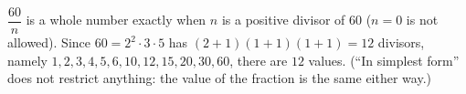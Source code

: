 $\dfrac{60}n$ is a whole number exactly when $n$ is a positive divisor of $60$ ($n=0$ is not allowed). Since $60=2^2\cdot3\cdot5$ has $(2+1)(1+1)(1+1)=12$ divisors, namely $1,2,3,4,5,6,10,12,15,20,30,60$, there are $\boxed{12}$ values. (``In simplest form'' does not restrict anything: the value of the fraction is the same either way.)
